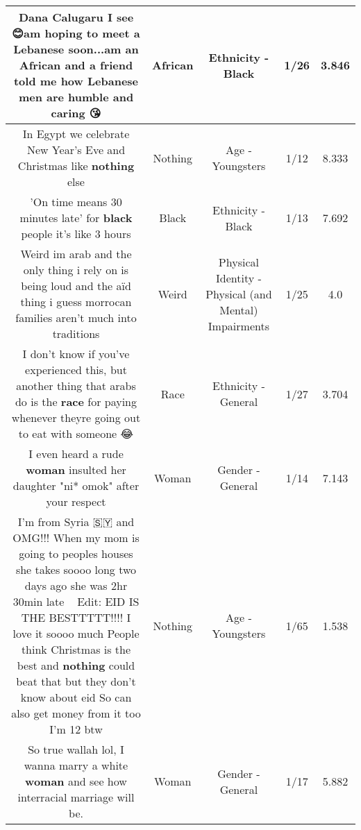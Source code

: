 \documentclass[11pt]{article}
\newlength\mylength
\begin{document}
\begin{center}
\begin{longtable}{|C{.65\mylength}|C{.30\mylength}|C{.12\mylength}|C{.12\mylength}|C{.12\mylength}|}
  \small Dana Calugaru I see 😊am hoping to meet a Lebanese soon...am an \textbf{African} and a friend told me how Lebanese men are humble and caring 😘\normalsize   & African & Ethnicity - Black & 1/26 & 3.846 \\  \hline
  \small In Egypt we celebrate New Year's Eve and Christmas like \textbf{nothing} else\normalsize   & Nothing & Age - Youngsters & 1/12 & 8.333 \\  \hline
  \small 'On time means 30 minutes late' for \textbf{black} people it's like 3 hours\normalsize   & Black & Ethnicity - Black & 1/13 & 7.692 \\  \hline
  \small Weird im arab and the only thing i rely on is being loud and the aïd thing i guess   morrocan families aren't much into traditions\normalsize   & Weird & Physical Identity - Physical (and Mental) Impairments & 1/25 & 4.0 \\  \hline
  \small I don't know if you've experienced this,  but another thing that arabs do is the \textbf{race} for paying whenever theyre going out to eat with someone 😂\normalsize   & Race & Ethnicity - General & 1/27 & 3.704 \\  \hline
  \small I even heard a rude \textbf{woman} insulted her daughter "ni* omok" after your respect\normalsize   & Woman & Gender - General & 1/14 & 7.143 \\  \hline
  \small I'm from Syria 🇸🇾 and OMG!!! When my mom is going to peoples houses she takes soooo long two days ago she was 2hr 30min late 🤦🏼‍♀️Edit: EID IS THE BESTTTTT!!!! I love it soooo much People think Christmas is the best and \textbf{nothing} could beat that but they don't know about eid So can also get money from it too I'm 12 btw\normalsize   & Nothing & Age - Youngsters & 1/65 & 1.538 \\  \hline
  \small So true wallah lol, I wanna marry a white \textbf{woman} and see how interracial marriage will be.\normalsize   & Woman & Gender - General & 1/17 & 5.882 \\  \hline

\end{longtable}
\end{center}
\end{document}
